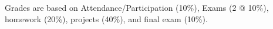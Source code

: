 
Grades are based on Attendance/Participation (10\%), Exams (2 @ 10\%), homework (20\%), projects (40\%), and final exam (10\%).   